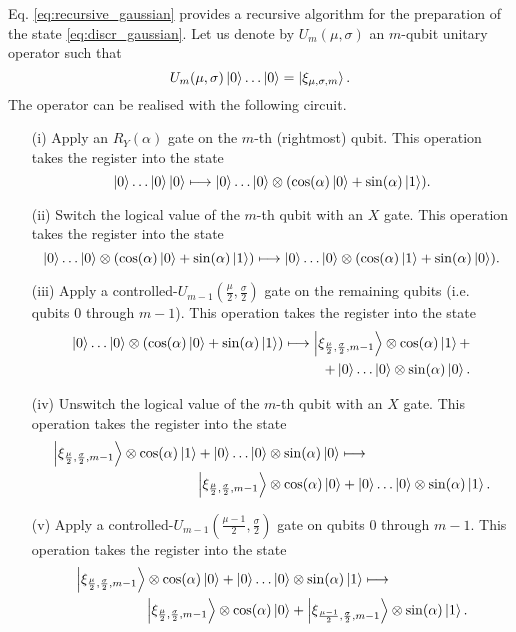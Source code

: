 \documentclass[a4paper,10pt]{report}
\begin{document}
Eq. \eqref{eq:recursive_gaussian} provides a recursive algorithm for the preparation of the state \eqref{eq:discr_gaussian}. Let us denote by $U_m(\mu,\sigma)$ an $m$-qubit unitary operator such that
\begin{equation}
U_m(\mu,\sigma)\ket{0}\dots\ket{0} = \ket{\xi_{\mu,\sigma,m}}.
\end{equation}
The operator can be realised with the following circuit.
\begin{itemize}
\item[(i)] Apply an $R_Y(\alpha)$ gate on the $m$-th (rightmost) qubit. This operation takes the register into the state
\begin{equation}
\ket{0}\dots\ket{0}\ket{0} \longmapsto \ket{0}\dots\ket{0}\otimes(\cos(\alpha)\ket{0}+\sin(\alpha)\ket{1}).
\end{equation}
\item[(ii)] Switch the logical value of the $m$-th qubit with an $X$ gate. This operation takes the register into the state
\begin{equation}
\ket{0}\dots\ket{0}\otimes(\cos(\alpha)\ket{0}+\sin(\alpha)\ket{1}) \longmapsto \ket{0}\dots\ket{0}\otimes(\cos(\alpha)\ket{1}+\sin(\alpha)\ket{0}).
\end{equation}
\item[(iii)] Apply a controlled-$U_{m-1}(\frac{\mu}{2},\frac{\sigma}{2})$ gate on the remaining qubits (i.e. qubits 0 through $m-1$). This operation takes the register into the state
\begin{align}
\ket{0}\dots\ket{0}\otimes(\cos(\alpha)\ket{0}+\sin(\alpha)\ket{1}) \longmapsto \ket{\xi_{\frac{\mu}{2},\frac{\sigma}{2},m-1}}\otimes\cos(\alpha)\ket{1} + \nonumber\\
+\ket{0}\dots\ket{0}\otimes\sin(\alpha)\ket{0}.
\end{align}
\item[(iv)] Unswitch the logical value of the $m$-th qubit with an $X$ gate. This operation takes the register into the state
\begin{align}
\ket{\xi_{\frac{\mu}{2},\frac{\sigma}{2},m-1}}\otimes\cos(\alpha)\ket{1} + 
\ket{0}\dots\ket{0} &\otimes\sin(\alpha)\ket{0} \longmapsto \nonumber\\
\ket{\xi_{\frac{\mu}{2},\frac{\sigma}{2},m-1}}&\otimes\cos(\alpha)\ket{0} + \ket{0}\dots\ket{0}\otimes\sin(\alpha)\ket{1}.
\end{align}
\item[(v)] Apply a controlled-$U_{m-1}(\frac{\mu-1}{2},\frac{\sigma}{2})$ gate on qubits 0 through $m-1$. This operation takes the register into the state
\begin{align}
\ket{\xi_{\frac{\mu}{2},\frac{\sigma}{2},m-1}}\otimes\cos(\alpha)\ket{0} + \ket{0}\dots\ket{0}&\otimes\sin(\alpha)\ket{1} \longmapsto \nonumber\\
\ket{\xi_{\frac{\mu}{2},\frac{\sigma}{2},m-1}}\otimes\cos(\alpha)\ket{0} &+ \ket{\xi_{\frac{\mu-1}{2},\frac{\sigma}{2},m-1}}\otimes\sin(\alpha)\ket{1}.
\end{align}
\end{itemize}
\end{document}
